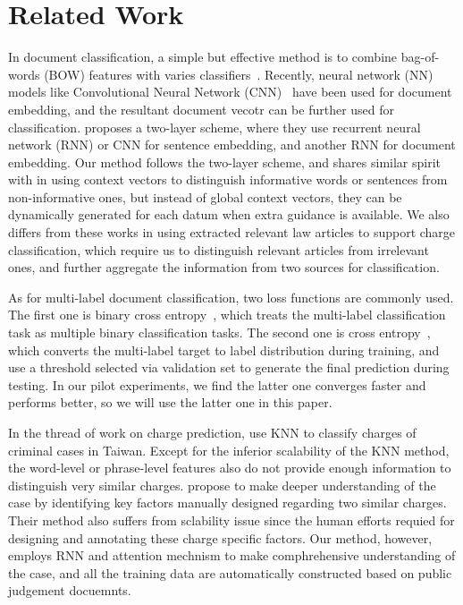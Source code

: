\section{Related Work}
\label{sec_related_work}
In document classification, a simple but effective method is to combine bag-of-words (BOW) features with varies classifiers~\cite{joachims1998text}. 
Recently, neural network (NN) models like Convolutional Neural Network (CNN)~\cite{kim2014convolutional} have been used for document embedding, and the resultant document vecotr can be further used for classification.
\cite{tang2015document} proposes a two-layer scheme, where they use recurrent neural network (RNN) or CNN for sentence embedding, and another RNN for document embedding.
Our method follows the two-layer scheme, and shares similar spirit with \cite{yang2016hierarchical} in using context vectors to distinguish informative words or sentences from non-informative ones, but instead of global context vectors, they can be dynamically generated for each datum when extra guidance is available.
We also differs from these works in using extracted relevant law articles to support charge classification, which require us to distinguish relevant articles from irrelevant ones, and further aggregate the information from two sources for classification.

As for multi-label document classification, two loss functions are commonly used. 
The first one is binary cross entropy~\cite{nam2014large}, which treats the multi-label classification task as multiple binary classification tasks. 
The second one is cross entropy~\cite{kurata2016improved}, which converts the multi-label target to label distribution during training, and use a threshold selected via validation set to generate the final prediction during testing. In our pilot experiments, we find the latter one converges faster and performs better, so we will use the latter one in this paper.

In the thread of work on charge prediction, \cite{LIU2004case,liu2006exploring} use KNN to classify charges of criminal cases in Taiwan. Except for the inferior scalability of the KNN method, the word-level or phrase-level features also do not provide enough information to distinguish very similar charges. \cite{lin2012exploiting} propose to make deeper understanding of the case by identifying key factors manually designed regarding two similar charges. Their method also suffers from sclability issue since the human efforts requied for designing and annotating these charge specific factors. Our method, however, employs RNN and attention mechnism to make comphrehensive understanding of the case, and all the training data are automatically constructed based on public judgement docuemnts. 

